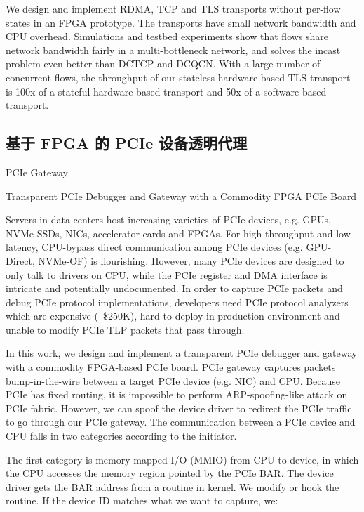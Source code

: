 We design and implement RDMA, TCP and TLS transports without per-flow states in an FPGA prototype. The transports have small network bandwidth and CPU overhead. Simulations and testbed experiments show that flows share network bandwidth fairly in a multi-bottleneck network, and solves the incast problem even better than DCTCP and DCQCN. With a large number of concurrent flows, the throughput of our stateless hardware-based TLS transport is 100x of a stateful hardware-based transport and 50x of a software-based transport.



\subsection{基于 FPGA 的 PCIe 设备透明代理}

PCIe Gateway

Transparent PCIe Debugger and Gateway with a Commodity FPGA PCIe Board

Servers in data centers host increasing varieties of PCIe devices, e.g. GPUs, NVMe SSDs, NICs, accelerator cards and FPGAs. For high throughput and low latency, CPU-bypass direct communication among PCIe devices (e.g. GPU-Direct, NVMe-OF) is flourishing. However, many PCIe devices are designed to only talk to drivers on CPU, while the PCIe register and DMA interface is intricate and potentially undocumented. In order to capture PCIe packets and debug PCIe protocol implementations, developers need PCIe protocol analyzers which are expensive (~\$250K), hard to deploy in production environment and unable to modify PCIe TLP packets that pass through.

In this work, we design and implement a transparent PCIe debugger and gateway with a commodity FPGA-based PCIe board. PCIe gateway captures packets bump-in-the-wire between a target PCIe device (e.g. NIC) and CPU. Because PCIe has fixed routing, it is impossible to perform ARP-spoofing-like attack on PCIe fabric. However, we can spoof the device driver to redirect the PCIe traffic to go through our PCIe gateway. The communication between a PCIe device and CPU falls in two categories according to the initiator.

The first category is memory-mapped I/O (MMIO) from CPU to device, in which the CPU accesses the memory region pointed by the PCIe BAR. The device driver gets the BAR address from a routine in kernel. We modify or hook the routine. If the device ID matches what we want to capture, we:

